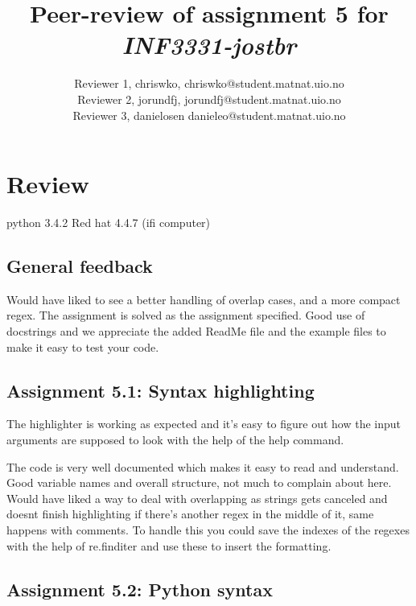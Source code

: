 \documentclass[a4paper]{article}
\title{Peer-review of assignment 5 for \textit{INF3331-jostbr}}
\author{Reviewer 1, chriswko, {chriswko@student.matnat.uio.no} \\
 		Reviewer 2, jorundfj, {jorundfj@student.matnat.uio.no} \\
        Reviewer 3, danielosen {danieleo@student.matnat.uio.no}}
\begin{document}
\maketitle



\section{Review}\label{sec:review}

python 3.4.2 Red hat 4.4.7 (ifi computer)
\subsection*{General feedback}
Would have liked to see a better handling of overlap cases, and a more compact regex. The assignment is solved as the assignment specified. Good use of docstrings and we appreciate the added ReadMe file and the example files to make it easy to test your code.
\subsection*{Assignment 5.1: Syntax highlighting}

The highlighter is working as expected and it's easy to figure out how the input arguments are supposed to look with the help of the help command.

\vspace{5mm}

\noindent The code is very well documented which makes it easy to read and understand. Good variable names and overall structure, not much to complain about here. Would have liked a way to deal with overlapping as strings gets canceled and doesnt finish highlighting if there's another regex in the middle of it, same happens with comments. To handle this you could save the indexes of the regexes with the help of re.finditer and use these to insert the formatting. 

\subsection*{Assignment 5.2: Python syntax} \label{sec:assignment5.2}
\end{document}

